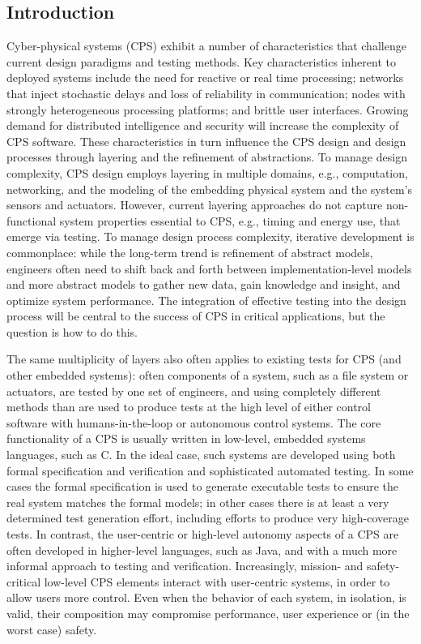 \subsection{Introduction}

Cyber-physical systems (CPS) exhibit a number of characteristics that challenge current design paradigms and testing methods.  Key characteristics inherent to deployed systems include the need for reactive or real time processing; networks that inject stochastic delays and loss of reliability in communication; nodes with strongly heterogeneous processing platforms; and brittle user interfaces. Growing demand for distributed intelligence and security will increase the complexity of CPS software. These characteristics in turn influence the CPS design and design processes through layering and the refinement of abstractions. To manage design complexity, CPS design employs layering in multiple domains, e.g., computation, networking, and the modeling of the embedding physical system and the system's sensors and actuators. However, current layering approaches do not capture non-functional system properties essential to CPS, e.g., timing and energy use, that emerge via testing.  To manage design process complexity, iterative development is commonplace: while the long-term trend is refinement of abstract models, engineers often need to shift back and forth  between implementation-level models and more abstract models to gather new data, gain knowledge and insight, and optimize system performance.  The integration of effective testing into the design process will be central to the success of CPS in critical applications, but the question is how to do this.

The same multiplicity of layers also often applies to existing tests for CPS (and other embedded systems):  often components of a system, such as a file system or actuators, are tested by one set of engineers, and using completely different methods than are used to produce tests at the high level of either control software with humans-in-the-loop or autonomous control systems.  
The core functionality of a CPS is usually written in low-level, embedded
systems languages, such as C.  In the ideal case, such systems are developed using both formal specification and verification and sophisticated automated
testing.  In some cases the formal specification is used to generate
executable tests to ensure the real system matches the formal models;
in other cases there is at least a very determined test generation
effort, including efforts to produce very high-coverage tests.  In
contrast, the user-centric or high-level autonomy aspects of a CPS are often developed in higher-level
languages, such as Java, and with a much more informal approach to
testing and verification.  Increasingly, mission- and safety-critical low-level CPS elements interact with user-centric systems, in order to allow users more
control.  Even when the behavior of each system, in isolation, is
valid, their composition may compromise performance, user experience or (in
the worst case) safety.

